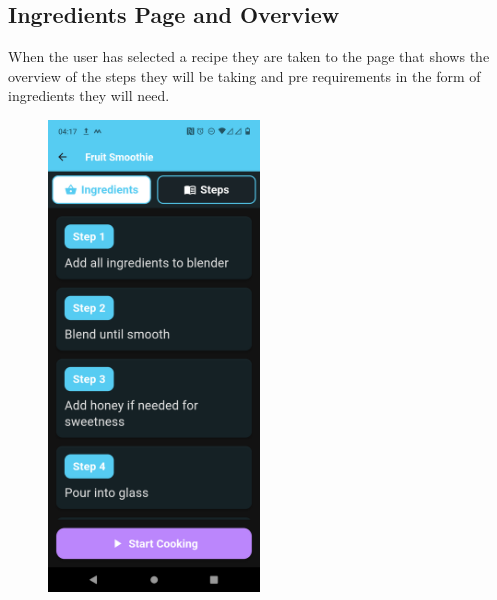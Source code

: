 \documentclass[]{project_final}
\begin{document}
\subsection{Ingredients Page and Overview}
When the user has selected a recipe they are taken to the page that shows the overview of the steps they will be taking and pre requirements in the form of ingredients they will need.
\begin{figure}[ht!]
  \centering
  \begin{minipage}[t]{0.4\textwidth}
    \includegraphics[width=0.5\textwidth]{presteps.png}
  \end{minipage}
  \hfill
  \begin{minipage}[t]{0.4\textwidth}

\end{minipage}
\end{figure}
\end{document}
